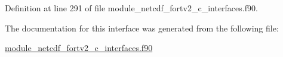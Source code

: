 Definition at line 291 of file module\+\_\+netcdf\+\_\+fortv2\+\_\+c\+\_\+interfaces.\+f90.



The documentation for this interface was generated from the following file\+:\begin{DoxyCompactItemize}
\item 
\hyperlink{module__netcdf__fortv2__c__interfaces_8f90}{module\+\_\+netcdf\+\_\+fortv2\+\_\+c\+\_\+interfaces.\+f90}\end{DoxyCompactItemize}
